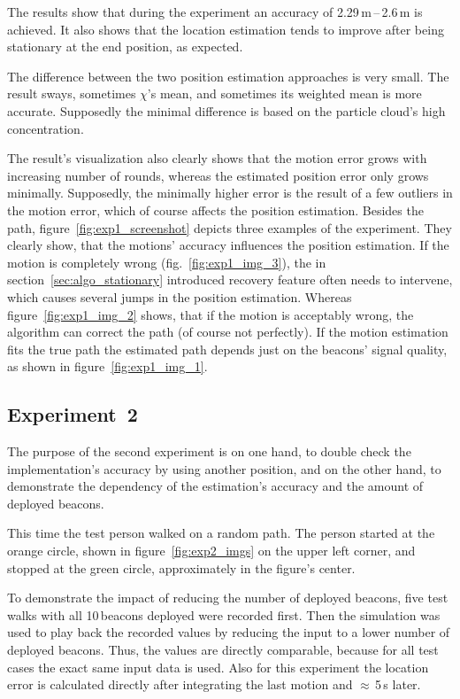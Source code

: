 The results show that during the experiment an accuracy of 2.29\,m\,--\,2.6\,m is achieved. It also shows that the location estimation tends to improve after being stationary at the end position, as expected.

The difference between the two position estimation approaches is very small. The result sways, sometimes $\chi$'s mean, and sometimes its weighted mean is more accurate. Supposedly the minimal difference is based on the particle cloud's high concentration.

The result's visualization also clearly shows that the motion error grows with increasing number of rounds, whereas the estimated position error only grows minimally. Supposedly, the minimally higher error is the result of a few outliers in the motion error, which of course affects the position estimation. Besides the path, figure~\ref{fig:exp1_screenshot} depicts three examples of the experiment. They clearly show, that the motions' accuracy influences the position estimation. If the motion is completely wrong (fig.\ \ref{fig:exp1_img_3}), the in section~\ref{sec:algo_stationary} introduced recovery feature often needs to intervene, which causes several jumps in the position estimation. Whereas figure~\ref{fig:exp1_img_2} shows, that if the motion is acceptably wrong, the algorithm can correct the path (of course not perfectly). If the motion estimation fits the true path the estimated path depends just on the beacons' signal quality, as shown in figure~\ref{fig:exp1_img_1}.

\subsection*{Experiment~2}
The purpose of the second experiment is on one hand, to double check the implementation's accuracy by using another position, and on the other hand, to demonstrate the dependency of the estimation's accuracy and the amount of deployed beacons.

This time the test person walked on a random path. The person started at the orange circle, shown in figure~\ref{fig:exp2_imgs} on the upper left corner, and stopped at the green circle, approximately in the figure's center.

To demonstrate the impact of reducing the number of deployed beacons, five test walks with all 10\,beacons deployed were recorded first. Then the simulation was used to play back the recorded values by reducing the input to a lower number of deployed beacons. Thus, the values are directly comparable, because for all test cases the exact same input data is used. Also for this experiment the location error is calculated directly after integrating the last motion and $\approx$\,5\,s later.


